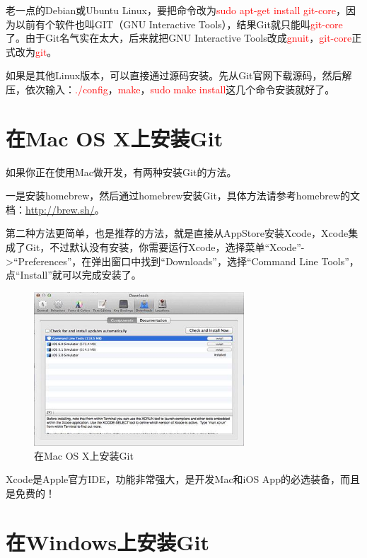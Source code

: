 老一点的Debian或Ubuntu Linux，要把命令改为\textcolor{red}{sudo apt-get install git-core}，因为以前有个软件也叫GIT（GNU Interactive Tools），结果Git就只能叫\textcolor{red}{git-core}了。由于Git名气实在太大，后来就把GNU Interactive Tools改成\textcolor{red}{gnuit}，\textcolor{red}{git-core}正式改为\textcolor{red}{git}。

如果是其他Linux版本，可以直接通过源码安装。先从Git官网下载源码，然后解压，依次输入：\textcolor{red}{./config}，\textcolor{red}{make}，\textcolor{red}{sudo make install}这几个命令安装就好了。

\section{在Mac OS X上安装Git}

如果你正在使用Mac做开发，有两种安装Git的方法。

一是安装homebrew，然后通过homebrew安装Git，具体方法请参考homebrew的文档：\url{http://brew.sh/}。

第二种方法更简单，也是推荐的方法，就是直接从AppStore安装Xcode，Xcode集成了Git，不过默认没有安装，你需要运行Xcode，选择菜单“Xcode”->“Preferences”，在弹出窗口中找到“Downloads”，选择“Command Line Tools”，点“Install”就可以完成安装了。

\begin{figure}[h]
    \centering
    \includegraphics[width=0.7\textwidth]{img/install-git-by-xcode.jpg}
    \caption{在Mac OS X上安装Git}
    \label{fig:mesh1}
\end{figure}


Xcode是Apple官方IDE，功能非常强大，是开发Mac和iOS App的必选装备，而且是免费的！

\section{在Windows上安装Git}

